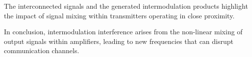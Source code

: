 
    
    

The interconnected signals and the generated intermodulation products highlight the impact of signal mixing within transmitters operating in close proximity. 

In conclusion, intermodulation interference arises from the non-linear mixing of output signals within amplifiers, leading to new frequencies that can disrupt communication channels.
